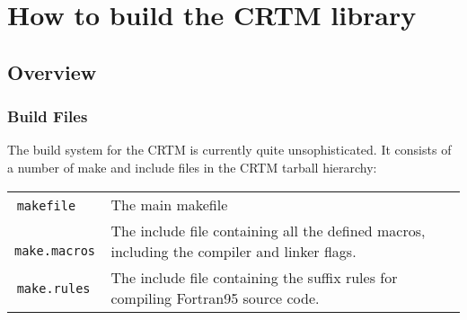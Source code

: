 \chapter{How to build the CRTM library}

\section{Overview}

\subsection{Build Files}
The build system for the CRTM is currently quite unsophisticated. It consists of a number of make and include files in the CRTM tarball hierarchy:

\begin{tabular}{l@{ : }p{4.75in}}
  \,\texttt{makefile} & The main makefile\\
  \,\texttt{make.macros} & The include file containing all the defined macros, including the compiler and linker flags.\\
  \,\texttt{make.rules} & The include file containing the suffix rules for compiling Fortran95 source code.\\
\end{tabular}


